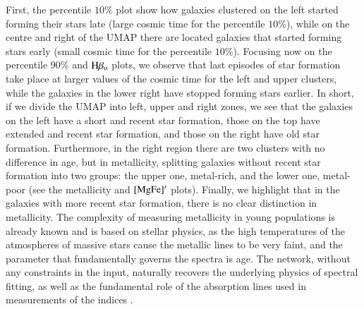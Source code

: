 First, the percentile $10\%$ plot show how galaxies clustered on the left started forming their stars late (large cosmic time for the percentile $10\%$), while on the centre and right of the UMAP there are located galaxies that started forming stars early (small cosmic time for the percentile $10\%$). Focusing now on the percentile $90\%$ and $\rm H{\beta_{o}}$ plots,  we observe that last episodes of star formation take place at larger values of the cosmic time for the left and upper clusters, while the galaxies in the lower right have stopped forming stars earlier. In short, if we divide the UMAP into left, upper and right zones, we see that the galaxies on the left have a short and recent star formation, those on the top have extended and recent star formation, and those on the right have old star formation.  Furthermore, in the right region there are two clusters with no difference in age, but in metallicity, splitting galaxies without recent star formation into two groups: the upper one, metal-rich, and the lower one, metal-poor (see the metallicity and $[\rm{MgFe}]^{\prime}$ plots).  Finally, we highlight that in the galaxies with more recent star formation, there is no clear distinction in metallicity. The complexity of measuring metallicity in young populations is already known \citep{Conroy_2013} and is based on stellar physics, as the high temperatures of the atmospheres of massive stars cause the metallic lines to be very faint, and the parameter that fundamentally governs the spectra is age. The network, without any constraints in the input, naturally recovers the underlying physics of spectral fitting, as well as the fundamental role of the  absorption lines used in measurements of the indices \citep{Vazdekis_2010}.




